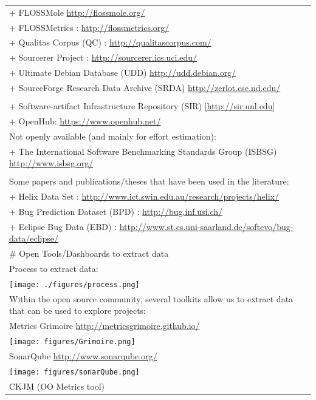 \documentclass[
]{book}
\begin{document}
\begin{longtable}[]{@{}
  >{\raggedleft\arraybackslash}p{}@{}}
 \\
+ FLOSSMole \citep{HCC06}
\url{http://flossmole.org/} \\
+ FLOSSMetrics \citep{herraiz2009flossmetrics}:
\url{http://flossmetrics.org/} \\
+ Qualitas Corpus (QC) \citep{QualitasCorpus2010}:
\url{http://qualitascorpus.com/} \\
+ Sourcerer Project \citep{LBNRB09}:
\url{http://sourcerer.ics.uci.edu/} \\
+ Ultimate Debian Database (UDD) \citep{NZ10}
\url{http://udd.debian.org/} \\
+ SourceForge Research Data Archive (SRDA) \citep{VanAntwerpM2008}
\url{http://zerlot.cse.nd.edu/} \\
 \\
+ Software-artifact Infrastructure Repository (SIR)
{[}\url{http://sir.unl.edu}{]} \\
+ OpenHub:
\url{https://www.openhub.net/} \\
Not openly available (and mainly for effort estimation): \\
+ The International Software Benchmarking Standards Group (ISBSG)
\url{http://www.isbsg.org/} \\
 \\
Some papers and publications/theses that have been used in the literature: \\
+ Helix Data Set \citep{Vasa2010}:
\url{http://www.ict.swin.edu.au/research/projects/helix/} \\
+ Bug Prediction Dataset (BPD) \citep[\citet{ALR11}]{DAmb2010a}:
\url{http://bug.inf.usi.ch/} \\
+ Eclipse Bug Data (EBD) \citep[\citet{NZZH12}]{ZPZ07}:
\url{http://www.st.cs.uni-saarland.de/softevo/bug-data/eclipse/} \\
\# Open Tools/Dashboards to extract data \\
Process to extract data: \\
\texttt{[image: ./figures/process.png]} \\
Within the open source community, several toolkits allow us to extract data that can be used to explore projects: \\
Metrics Grimoire
\url{http://metricsgrimoire.github.io/} \\
\texttt{[image: figures/Grimoire.png]} \\
SonarQube
\url{http://www.sonarqube.org/} \\
\texttt{[image: figures/sonarQube.png]} \\
CKJM (OO Metrics tool)

\end{longtable}
\end{document}
